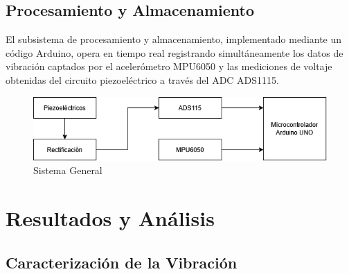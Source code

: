 \documentclass{article}
\begin{document}
\subsection{Procesamiento y Almacenamiento}
El subsistema de procesamiento y almacenamiento, implementado mediante un código Arduino\cite{1}, opera en tiempo real registrando simultáneamente los datos de vibración captados por el acelerómetro MPU6050 y las mediciones de voltaje obtenidas del circuito piezoeléctrico a través del ADC ADS1115.
\begin{figure}[H]
    \centering
    \includegraphics[scale=0.555]{SistemaGeneral.png}
    \caption{Sistema General}
    \label{fig:my_label}
\end{figure}

\section{Resultados y Análisis}

\subsection{Caracterización de la Vibración}
\end{document}
